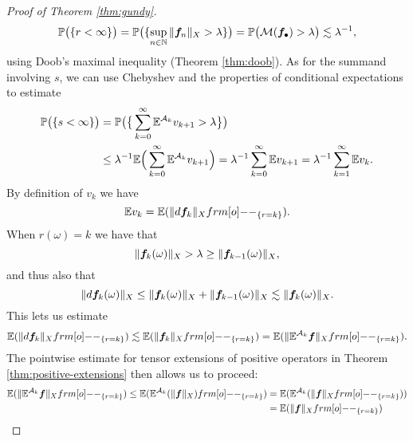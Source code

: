 \begin{proof}[Proof of Theorem \ref{thm:gundy}]
\begin{equation}
    \mathbb{P}\big(\{r < \infty\}\big) = \mathbb{P}\big( \{\sup_{n \in \mathbb{N}} \|\bm{f}_{n}\|_{X} > \lambda \} \big)
    = \mathbb{P}\big( \mathcal{M}(\bm{f}_{\bullet}) > \lambda \big) \lesssim \lambda^{-1},
  \end{equation}
  using Doob's maximal inequality (Theorem \ref{thm:doob}).
  As for the summand involving $s$, we can use Chebyshev and the properties of conditional expectations to estimate
  \begin{equation*}
    \begin{aligned}
      \mathbb{P}\big(\{s < \infty\}\big)
      &= \mathbb{P}\big( \big\{ \sum_{k=0}^{\infty} \mathbb{E}^{\mathcal{A}_{k}} v_{k+1} > \lambda \big\} \big) \\
      &\leq \lambda^{-1} \mathbb{E}\Big( \sum_{k=0}^{\infty} \mathbb{E}^{\mathcal{A}_{k}} v_{k+1} \Big)
      = \lambda^{-1} \sum_{k=0}^{\infty} \mathbb{E} v_{k+1}
      = \lambda^{-1} \sum_{k=1}^{\infty} \mathbb{E} v_{k}.
    \end{aligned}
  \end{equation*}
  By definition of $v_{k}$ we have
  \begin{equation*}
    \E v_{k} = \E ( \|d\mb{f}_{k}\|_{X} \1_{\{r = k\}} ).
  \end{equation*}
  When $r(\omega) = k$ we have that
  \begin{equation*}
    \|\bm{f}_{k}(\omega)\|_{X} > \lambda \geq \|\bm{f}_{k-1}(\omega)\|_{X},
  \end{equation*}
  and thus also that
  \begin{equation*}
    \|d\bm{f}_{k}(\omega)\|_{X} \leq \|\bm{f}_{k}(\omega)\|_{X} + \|\bm{f}_{k-1}(\omega)\|_{X} \lesssim \|\bm{f}_{k}(\omega)\|_{X}.
  \end{equation*}
  This lets us estimate
  \begin{equation*}
    \E ( \|d\mb{f}_{k}\|_{X} \1_{\{r = k\}} )
    \lesssim \E ( \|\mb{f}_{k}\|_{X} \1_{\{r = k\}} )
    = \E ( \|\E^{\mc{A}_{k}} \mb{f}\|_{X} \1_{\{r = k\}} ).
  \end{equation*}
  The pointwise estimate for tensor extensions of positive operators in Theorem \ref{thm:positive-extensions} then allows us to proceed:
  \begin{equation*}
    \begin{aligned}
    \E ( \|\E^{\mc{A}_{k}} \mb{f}\|_{X} \1_{\{r = k\}} )
    \leq \E ( \E^{\mc{A}_{k}}(\|\mb{f}\|_{X}) \1_{\{r = k\}} )
    &= \E ( \E^{\mc{A}_{k}}(\|\mb{f}\|_{X} \1_{\{r = k\}}) ) \\
    &= \E (\|\mb{f}\|_{X} \1_{\{r = k\}})
  \end{aligned}
  \end{equation*}

\end{proof}
